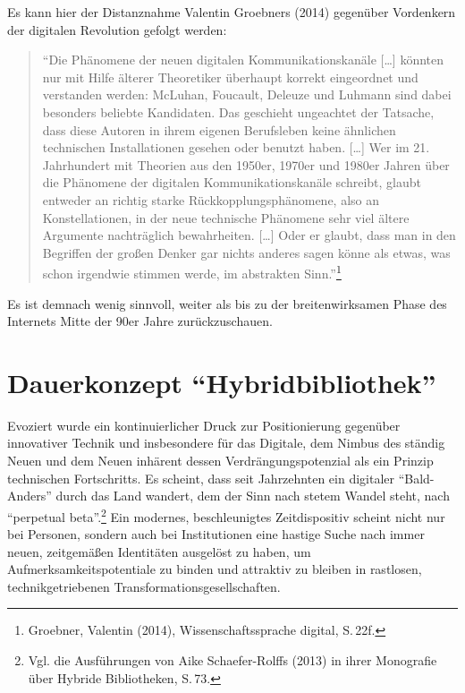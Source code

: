 \documentclass[a4paper,
fontsize=11pt,
oneside,
numbers=noperiodatend,
parskip=half-,
bibliography=totoc,
final
]{scrartcl}
\begin{document}
Es kann hier der Distanznahme Valentin Groebners (2014) gegenüber
Vordenkern der digitalen Revolution gefolgt werden:

\begin{quote}
\enquote{Die Phänomene der neuen digitalen Kommunikationskanäle
{[}\ldots{}{]} könnten nur mit Hilfe älterer Theoretiker überhaupt
korrekt eingeordnet und verstanden werden: McLuhan, Foucault, Deleuze
und Luhmann sind dabei besonders beliebte Kandidaten. Das geschieht
ungeachtet der Tatsache, dass diese Autoren in ihrem eigenen Berufsleben
keine ähnlichen technischen Installationen gesehen oder benutzt haben.
{[}\ldots{}{]} Wer im 21. Jahrhundert mit Theorien aus den 1950er,
1970er und 1980er Jahren über die Phänomene der digitalen
Kommunikationskanäle schreibt, glaubt entweder an richtig starke
Rückkopplungsphänomene, also an Konstellationen, in der neue technische
Phänomene sehr viel ältere Argumente nachträglich bewahrheiten.
{[}\ldots{}{]} Oder er glaubt, dass man in den Begriffen der großen
Denker gar nichts anderes sagen könne als etwas, was schon irgendwie
stimmen werde, im abstrakten Sinn.}\footnote{Groebner, Valentin (2014),
  Wissenschaftssprache digital, S.\,22f.}
\end{quote}

Es ist demnach wenig sinnvoll, weiter als bis zu der breitenwirksamen
Phase des Internets Mitte der 90er Jahre zurückzuschauen.

\section*{\texorpdfstring{Dauerkonzept
\enquote{Hybridbibliothek}}{Dauerkonzept Hybridbibliothek}}\label{dauerkonzept-hybridbibliothek}

Evoziert wurde ein kontinuierlicher Druck zur Positionierung gegenüber
innovativer Technik und insbesondere für das Digitale, dem Nimbus des
ständig Neuen und dem Neuen inhärent dessen Verdrängungspotenzial als
ein Prinzip technischen Fortschritts. Es scheint, dass seit Jahrzehnten
ein digitaler \enquote{Bald-Anders} durch das Land wandert, dem der Sinn
nach stetem Wandel steht, nach \enquote{perpetual beta}.\footnote{Vgl.
  die Ausführungen von Aike Schaefer-Rolffs (2013) in ihrer Monografie
  über Hybride Bibliotheken, S.\,73.} Ein modernes, beschleunigtes
Zeitdispositiv scheint nicht nur bei Personen, sondern auch bei
Institutionen eine hastige Suche nach immer neuen, zeitgemäßen
Identitäten ausgelöst zu haben, um Aufmerksamkeitspotentiale zu binden
und attraktiv zu bleiben in rastlosen, technikgetriebenen
Transformationsgesellschaften.
\end{document}
